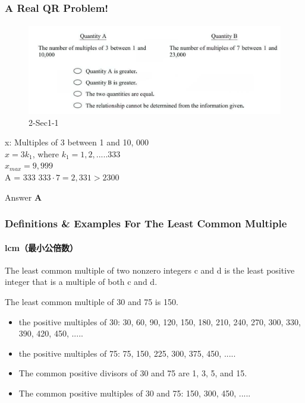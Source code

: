 \documentclass[
	11pt, %
	handout,
]{beamer}
\begin{document}
\begin{frame}
	\frametitle{A Real QR Problem!}
	\framesubtitle{}
	\begin{figure}
		\includegraphics[width=\linewidth]{Multiple_Example_Question1.png}
		\caption{2-Sec1-1}
	\end{figure}
	\pause
x: Multiples of 3 between 1 and 10, 000 \\ $x = 3k_1$, where $k_1 = 1, 2, ..... 333$ \\$x_{max} = 9,999$\\ A = 333 \quad
$333 \cdot 7 = 2,331 > 2300 $ \\
\pause

Answer \textbf{A}
\end{frame}


\begin{frame}
	\frametitle{Definitions \& Examples For The Least Common Multiple}
	\framesubtitle{lcm（最小公倍数）}
	
	\begin{definition}
	The least common multiple of two nonzero integers c and d is the least \alert{positive} integer that is a multiple of both c and d.
	\end{definition}
	
	\smallskip %
	
	\begin{example}
	The least common multiple of 30 and 75 is 150.
		\begin{itemize}
			\item the positive multiples of 30: 30, 60, 90, 120, 150, 180, 210, 240, 270, 300, 330, 390, 420, 450, .....
			\item the positive multiples of 75: 75, 150, 225, 300, 375, 450, .....
			\item The common positive divisors of 30 and 75 are 1, 3, 5, and 15.
			\item The common positive multiples of 30 and 75: 150, 300, 450, .....
		\end{itemize}
	\end{example}
\end{frame}
\end{document}
